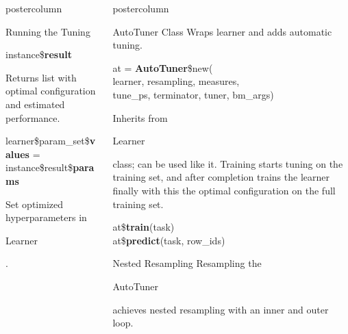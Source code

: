 \documentclass{beamer}
\newlength{\columnheight} %
\newcommand{\codeinline}[1]{\begin{codeboxinline}#1\end{codeboxinline}}
\begin{document}
\begin{frame}[fragile]{}
\begin{columns}
\begin{column}{.245\textwidth}
\begin{beamercolorbox}[center]{postercolumn}
\begin{minipage}{.98\textwidth}
{\begin{myblock}{Running the Tuning}
\begin{codebox}
								instance\$\textbf{result}
							\end{codebox}
							Returns list with optimal configuration and estimated performance.
							\\
							\begin{codebox}
								{\footnotesize learner\$param\_set\$\textbf{values} = instance\$result\$\textbf{params}}
							\end{codebox}
							Set optimized hyperparameters in \codeinline{Learner}.
						\end{myblock}
						\vfill}
				\end{minipage}
			\end{beamercolorbox}
		\end{column}
		\begin{column}{.245\textwidth}
			\begin{beamercolorbox}[center]{postercolumn}
				\begin{minipage}{.98\textwidth}
					\parbox[t][\columnheight]{\textwidth}{
						\begin{myblock}{AutoTuner Class}
							Wraps learner and adds automatic tuning. 
							\\
							\begin{codeboxmultiline}[width=23.75cm]
								at = \textbf{AutoTuner}\$new(\\
								\hspace*{1ex}learner, resampling, measures, \\
								\hspace*{1ex}tune\_ps, terminator, tuner, bm\_args)
							\end{codeboxmultiline}
							\vspace{0.5em}
                            Inherits from \codeinline{Learner} class; can be used like it. 
                            Training starts tuning on the training set,
                            and after completion trains the learner finally with 
                            this the optimal configuration on the full training set.
							\begin{codeboxmultiline}[width=16.5cm]
								at\$\textbf{train}(task)\\
								at\$\textbf{predict}(task, row\_ids)
							\end{codeboxmultiline}
						\end{myblock}
						\begin{myblock}{Nested Resampling}
							Resampling the \codeinline{AutoTuner} achieves nested resampling 
							with an inner and outer loop. 

\end{myblock}}
\end{minipage}
\end{beamercolorbox}
\end{column}
\end{columns}
\end{frame}
\end{document}

